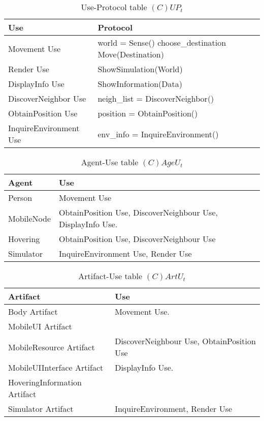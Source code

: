 \begin{table}[H]
	\centering
	\begin{tabular}{|p{4cm}|p{8cm}|}
			\hline
			\textbf{Use} & \textbf{Protocol} \\
			\hline
			Movement Use & world = Sense()\newline
			               choose\_destination\newline
			               Move(Destination) \\
			\hline
			Render Use & ShowSimulation(World) \\
			\hline
			DisplayInfo Use & ShowInformation(Data) \\
			\hline
      DiscoverNeighbor Use & neigh\_list = DiscoverNeighbor()\\
			\hline
      ObtainPosition Use & position = ObtainPosition()\\
			\hline
			InquireEnvironment Use & env\_info = InquireEnvironment()\\
			\hline
		\end{tabular}
	\caption{Use-Protocol table $(C)UP_t$}
	\label{tab:cupt}
\end{table}

\begin{table}[H]
	\centering
	\begin{tabular}{|p{4cm}|p{8cm}|}
			\hline
			\textbf{Agent} & \textbf{Use} \\
			\hline
			Person & Movement Use \\
			\hline
      MobileNode & ObtainPosition Use, DiscoverNeighbour Use, DisplayInfo Use. \\
			\hline
			Hovering &  ObtainPosition Use, DiscoverNeighbour Use\\
			\hline
			Simulator & InquireEnvironment Use, Render Use \\
			\hline
		\end{tabular}
	\caption{Agent-Use table $(C)AgeU_t$}
	\label{tab:cageut}
\end{table}

\begin{table}[H]
	\centering
	\begin{tabular}{|p{4cm}|p{8cm}|}
			\hline
			\textbf{Artifact} & \textbf{Use} \\
			\hline
			Body Artifact & Movement Use. \\
			\hline
			MobileUI Artifact & \\
			\hline
      MobileResource Artifact & DiscoverNeighbour Use, ObtainPosition Use \\
			\hline
			MobileUIInterface Artifact & DisplayInfo Use. \\
			\hline
			HoveringInformation Artifact & \\
			\hline
			Simulator Artifact & InquireEnvironment, Render Use \\
			\hline
		\end{tabular}
	\caption{Artifact-Use table $(C)ArtU_t$}
	\label{tab:cartut}
\end{table}

